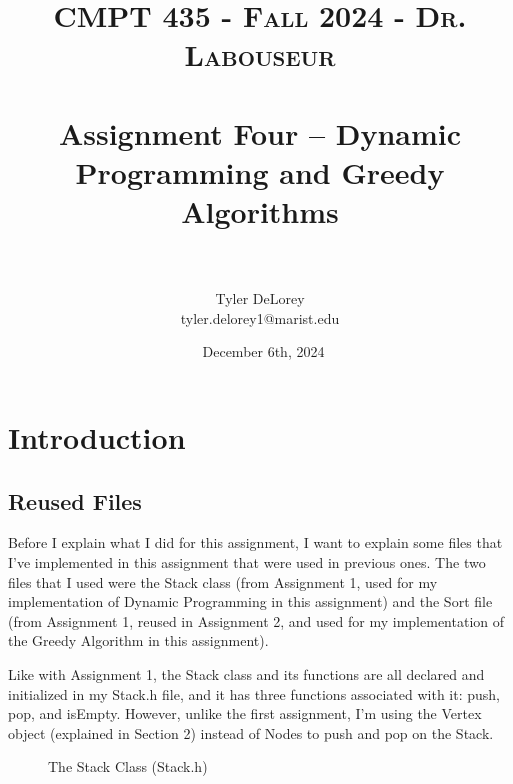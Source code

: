 \documentclass[letterpaper, 10pt]{article}
\title{	
   \normalfont \normalsize 
   \textsc{CMPT 435 - Fall 2024 - Dr. Labouseur} \\[10pt] %
   \horrule{0.5pt} \\[0.25cm] 	%
   \huge Assignment Four -- Dynamic Programming and Greedy Algorithms \\     	    %
   \horrule{0.5pt} \\[-0.25cm] 	%
}
\author{Tyler DeLorey \\ \normalsize tyler.delorey1@marist.edu}
\date{\normalsize\ December 6th, 2024}
\begin{document}
 
\maketitle %


\renewcommand{\thefigure}{\thesection.\arabic{figure}}

\tableofcontents

\section{Introduction}
\subsection{Reused Files}

\noindent
Before I explain what I did for this assignment, I want to explain some files that I've implemented in this assignment that were used in previous ones. The two files that I used were the Stack class (from Assignment 1, used for my implementation of Dynamic Programming in this assignment) and the Sort file (from Assignment 1, reused in Assignment 2, and used for my implementation of the Greedy Algorithm in this assignment). 

\vspace{1em}

\noindent
Like with Assignment 1, the Stack class and its functions are all declared and initialized in my Stack.h file, and it has three functions associated with it: push, pop, and isEmpty. However, unlike the first assignment, I'm using the Vertex object (explained in Section 2) instead of Nodes to push and pop on the Stack. 

\begin{figure}[H]
  \centering
   
  \label{fig:figure1.1-part1}
\end{figure}

\begin{figure}[H]
  \centering
   
  \caption{The Stack Class (Stack.h)}
  \label{fig:figure1.1-part2}
\end{figure}
\end{document}

